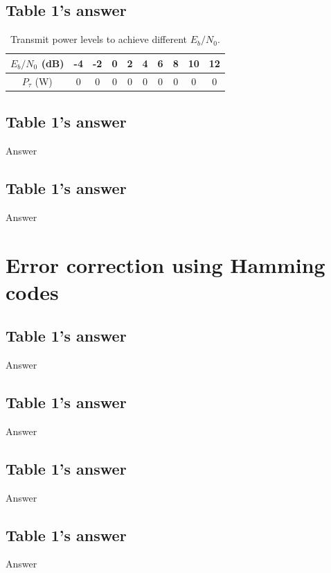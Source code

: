 \documentclass[11pt]{article}
\begin{document}
\subsection{Table 1's answer}

\begin{table}[h]
\centering
\caption{\label{tab:transmit_power_levels}Transmit power levels to achieve different $E_{b}/N_{0}$.}
\begin{tabular}{|c|c|c|c|c|c|c|c|c|c|}

\hline
$E_{b}/N_{0}$ (dB) & -4 & -2 & 0 & 2 & 4 & 6 & 8 & 10 & 12 \\\hline
$P_{\tau}$ (W) & 0 & 0 & 0 & 0 & 0 & 0 & 0 & 0 & 0 \\\hline             %

\end{tabular}

\end{table}

\subsection{Table 1's answer}
Answer
\subsection{Table 1's answer}
Answer
\section{Error correction using Hamming codes}
\subsection{Table 1's answer}
Answer
\subsection{Table 1's answer}
Answer
\subsection{Table 1's answer}
Answer
\subsection{Table 1's answer}
Answer
\end{document}
